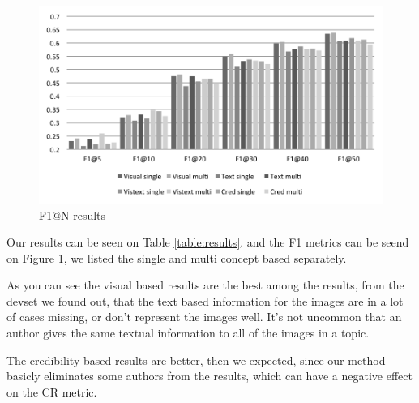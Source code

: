 \documentclass{sig-alternate}
\begin{document}
\begin{figure}[h]
\includegraphics[width=1.0\linewidth]{f1}
\caption{F1@N results}
\label{fig:f1}
\end{figure}

Our results can be seen on Table \ref{table:results}. and the F1 metrics can be seend on Figure \ref{fig:f1}, we listed the single and multi concept based separately. 

As you can see the visual based results are the best among the results, from the devset we found out, that the text based information for the images are in a lot of cases missing, or don't represent the images well. It's not uncommon that an author gives the same textual information to all of the images in a topic.

The credibility based results are better, then we expected, since our method basicly eliminates some authors from the results, which can have a negative effect on the CR metric.



\end{document}
